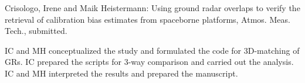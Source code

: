 \begin{multicols}{2}
\medskip

\noindent \hangindent=0.6cm Crisologo, Irene and Maik Heistermann: Using ground radar overlaps to verify the retrieval of calibration bias estimates from spaceborne platforms, Atmos. Meas. Tech., submitted.

\medskip

IC and MH conceptualized the study and formulated the code for 3D-matching of GRs. IC prepared the scripts for 3-way comparison and carried out the analysis. IC and MH interpreted the results and prepared the manuscript. 




\end{multicols}